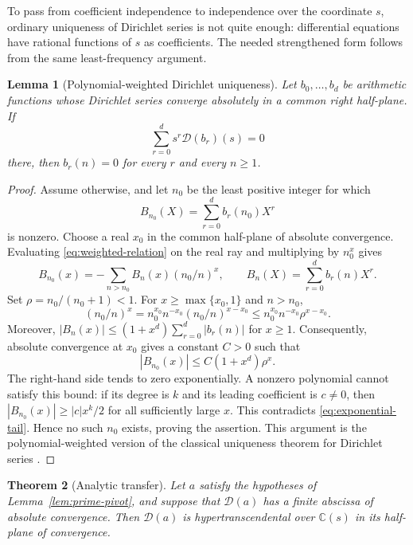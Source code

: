 \documentclass[11pt]{article}
\numberwithin{equation}{section}
\newtheorem{theorem}{Theorem}[section]
\newtheorem{lemma}[theorem]{Lemma}
\theoremstyle{definition}
\theoremstyle{remark}
\newcommand{\C}{\mathbb C}
\newcommand{\D}{\mathcal D}
\begin{document}
To pass from coefficient independence to independence over the coordinate $s$, ordinary
uniqueness of Dirichlet series is not quite enough: differential equations have rational
functions of $s$ as coefficients.  The needed strengthened form follows from the same
least-frequency argument.

\begin{lemma}[Polynomial-weighted Dirichlet uniqueness]
\label{lem:weighted-uniqueness}
Let $b_0,\ldots,b_d$ be arithmetic functions whose Dirichlet series converge absolutely in a
common right half-plane.  If
\begin{equation}
 \sum_{r=0}^{d}s^r\D(b_r)(s)=0
 \label{eq:weighted-relation}
\end{equation}
there, then $b_r(n)=0$ for every $r$ and every $n\geq1$.
\end{lemma}

\begin{proof}
Assume otherwise, and let $n_0$ be the least positive integer for which
\[
 B_{n_0}(X)=\sum_{r=0}^{d}b_r(n_0)X^r
\]
is nonzero.  Choose a real $x_0$ in the common half-plane of absolute convergence.  Evaluating
\eqref{eq:weighted-relation} on the real ray and multiplying by $n_0^x$ gives
\begin{equation}
 B_{n_0}(x)=-\sum_{n>n_0}B_n(x)(n_0/n)^x,
 \qquad B_n(X)=\sum_{r=0}^{d}b_r(n)X^r.
 \label{eq:least-frequency}
\end{equation}
Set $\rho=n_0/(n_0+1)<1$.  For $x\geq\max\{x_0,1\}$ and $n>n_0$,
\[
 (n_0/n)^x
 =n_0^{x_0}n^{-x_0}(n_0/n)^{x-x_0}
 \leq n_0^{x_0}n^{-x_0}\rho^{x-x_0}.
\]
Moreover,
$|B_n(x)|\leq(1+x^d)\sum_{r=0}^d|b_r(n)|$ for $x\geq1$.  Consequently, absolute convergence at
$x_0$ gives a constant $C>0$ such that
\begin{equation}
 |B_{n_0}(x)|\leq C(1+x^d)\rho^x.
 \label{eq:exponential-tail}
\end{equation}
The right-hand side tends to zero exponentially.  A nonzero polynomial cannot satisfy this
bound: if its degree is $k$ and its leading coefficient is $c\neq0$, then
$|B_{n_0}(x)|\geq |c|x^k/2$ for all sufficiently large $x$.  This contradicts
\eqref{eq:exponential-tail}.  Hence no such $n_0$ exists, proving the assertion.  This argument is
the polynomial-weighted version of the classical uniqueness theorem for Dirichlet series
\cite{HardyRiesz1915}.
\end{proof}

\begin{theorem}[Analytic transfer]
\label{thm:analytic-transfer}
Let $a$ satisfy the hypotheses of Lemma~\ref{lem:prime-pivot}, and suppose that $\D(a)$ has a
finite abscissa of absolute convergence.  Then $\D(a)$ is hypertranscendental over $\C(s)$ in its
half-plane of convergence.
\end{theorem}
\end{document}
